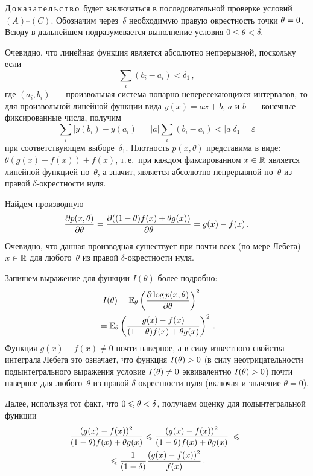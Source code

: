 \begin{multicols}{2}
\medskip

\noindent
Д\,о\,к\,а\,з\,а\,т\,е\,л\,ь\,с\,т\,в\,о\ будет заключаться в последовательной проверке условий
$(A)$--$(C)$. Обозначим через~$\delta$ необходимую правую окрестность
точки $\theta\hm=0$. Всюду в дальнейшем подразумевается выполнение
условия $0\leqslant\theta<\delta$.

 Очевидно, что линейная функция является абсолютно
непрерывной, поскольку если
\begin{equation*}
\sum\limits_i(b_i-a_i)<\delta_1\,,
\end{equation*}
где $(a_i,b_i)$~--- произвольная система попарно непересекающихся
интервалов, то для произвольной линейной функции вида $y(x)=ax+b$, $a$ и $b$~--- 
конечные фиксированные числа, получим
\begin{equation*}
\sum\limits_i|y(b_i)-y(a_i)|=|a|\sum\limits_i(b_i-a_i)<|a|\delta_1=\varepsilon
\end{equation*}
при соответствующем выборе~$\delta_1$. Плотность $p(x,\theta)$
представима в виде:
$
\theta (g(x)-f(x))+f(x)$,
т.\,е.\ при каждом фиксированном $x\in\mathbb{R}$
является линейной функцией по~$\theta$, а значит, является абсолютно
непрерывной по~$\theta$ из правой $\delta$-окрест\-ности нуля.

 Найдем производную
\begin{equation*}
\displaystyle\frac{\displaystyle \partial p(x,\theta)\mathstrut}{\displaystyle \partial\theta\mathstrut}=\displaystyle\frac{\displaystyle \partial
((1-\theta) f(x)+\theta g(x))\mathstrut}{\displaystyle \partial\theta\mathstrut}=g(x)-f(x)\,.
\end{equation*}
Очевидно, что данная производная существует при почти всех (по мере
Лебега) $x\in\mathbb{R}$ для любого~$\theta$ из правой $\delta$-окрест\-ности
нуля.

 Запишем выражение для функции $I(\theta)$ более
подробно:
\begin{multline*}
I(\theta)=\mathbb E_\theta\left(\displaystyle\frac{\displaystyle \partial \log
p(x,\theta)\mathstrut}{\displaystyle \partial\theta\mathstrut}\right)^2={}\\
{}=\mathbb E_\theta\left(\displaystyle\frac{\displaystyle g(x)-f(x)\mathstrut}{\displaystyle (1-\theta)
f(x)+\theta g(x)\mathstrut}\right)^2\,.
\end{multline*}
Функция $g(x)-f(x)\neq0$ почти наверное, а в силу известного
свойства интеграла Лебега это означает, что функция $I(\theta)\hm>0$ (в
силу неотри\-ца\-тель\-ности подынтегрального выражения условие
$I(\theta)\hm\neq 0$ эквивалентно $I(\theta)\hm>0$) почти наверное для
любого~$\theta$ из правой $\delta$-окрест\-ности нуля (включая и
значение $\theta=0$).

Далее, используя тот факт, что $0\hm\leqslant\theta\hm<\delta$, получаем оценку
для подынтегральной функции
\begin{multline}
\label{Ival} 
\!\!\!\displaystyle\frac{\displaystyle (g(x)-f(x))^2\mathstrut}{\displaystyle (1-\theta) f(x)+\theta
g(x)\mathstrut}\leqslant\displaystyle\frac{\displaystyle (g(x)-f(x))^2\mathstrut}{\displaystyle (1-\theta) f(x)+\theta
g(x)\mathstrut}\;\leqslant\\
{}\leqslant \displaystyle\frac{\displaystyle 1\mathstrut}{\displaystyle (1-\delta)\mathstrut}\displaystyle\frac{\displaystyle (g(x)-f(x))^2\mathstrut}{\displaystyle f(x)\mathstrut}\,.
\end{multline}


\end{multicols}
